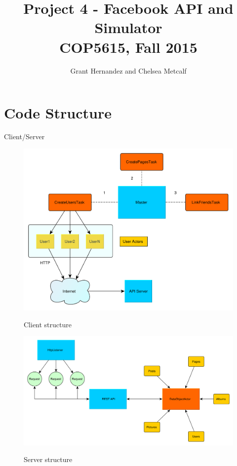 \documentclass{article}
\begin{document}
\title{Project 4 - Facebook API and Simulator \\ COP5615, Fall 2015}
 
\author{Grant Hernandez and Chelsea Metcalf}
 
\maketitle %
 
\section*{Code Structure}
Client/Server
\begin{figure}[H]
  \centering
  \includegraphics[scale=0.5]{diagrams/client-structure.pdf}
  \label{cli-struct}
  \caption{Client structure}
\end{figure}

\begin{figure}[H]
  \centering
  \includegraphics[scale=0.5]{diagrams/server-structure.pdf}
  \label{svr-struct}
  \caption{Server structure}
\end{figure}
\end{document}
